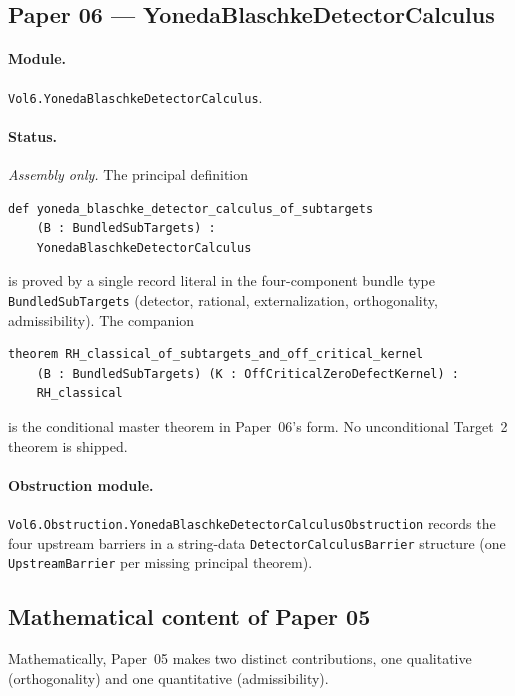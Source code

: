 \documentclass[11pt]{article}
\theoremstyle{plain}
\theoremstyle{definition}
\theoremstyle{remark}
\newcommand{\code}[1]{\texttt{#1}}
\begin{document}
\subsection{Paper 06 --- YonedaBlaschkeDetectorCalculus}
\label{sec:p06}

\paragraph{Module.}
\code{Vol6.YonedaBlaschkeDetectorCalculus}.

\paragraph{Status.}
\emph{Assembly only.} The principal definition
\begin{lstlisting}
def yoneda_blaschke_detector_calculus_of_subtargets
    (B : BundledSubTargets) :
    YonedaBlaschkeDetectorCalculus
\end{lstlisting}
is proved by a single record literal in the four-component bundle
type \code{BundledSubTargets} (detector, rational, externalization,
orthogonality, admissibility). The companion
\begin{lstlisting}
theorem RH_classical_of_subtargets_and_off_critical_kernel
    (B : BundledSubTargets) (K : OffCriticalZeroDefectKernel) :
    RH_classical
\end{lstlisting}
is the conditional master theorem in Paper~06's form.  No
unconditional Target~2 theorem is shipped.

\paragraph{Obstruction module.}
\code{Vol6.Obstruction.YonedaBlaschkeDetectorCalculusObstruction}
records the four upstream barriers in a string-data
\code{DetectorCalculusBarrier} structure (one
\code{UpstreamBarrier} per missing principal theorem).

\subsection{Mathematical content of Paper 05}

Mathematically, Paper~05 makes two distinct contributions, one
qualitative (orthogonality) and one quantitative (admissibility).
\end{document}
